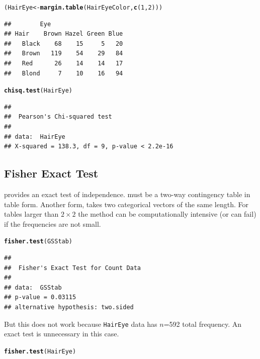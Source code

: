 \documentclass[10pt,twoside]{article}\usepackage[]{graphicx}\usepackage[]{color}
\makeatletter
\newcommand{\hlnum}[1]{\textcolor[rgb]{0.686,0.059,0.569}{#1}}%
\newcommand{\hlstd}[1]{\textcolor[rgb]{0.345,0.345,0.345}{#1}}%
\newcommand{\hlkwb}[1]{\textcolor[rgb]{0.69,0.353,0.396}{#1}}%
\newcommand{\hlkwd}[1]{\textcolor[rgb]{0.737,0.353,0.396}{\textbf{#1}}}%
\newenvironment{kframe}{%
 \def\at@end@of@kframe{}%
 \ifinner\ifhmode%
  \def\at@end@of@kframe{\end{minipage}}%
  \begin{minipage}{\columnwidth}%
 \fi\fi%
 \def\FrameCommand##1{\hskip\@totalleftmargin \hskip-\fboxsep
 \colorbox{shadecolor}{##1}\hskip-\fboxsep
     \hskip-\linewidth \hskip-\@totalleftmargin \hskip\columnwidth}%
 \MakeFramed {\advance\hsize-\width
   \@totalleftmargin\z@ \linewidth\hsize
   \@setminipage}}%
 {\par\unskip\endMakeFramed%
 \at@end@of@kframe}
\newenvironment{knitrout}{}{} %
\newcommand{\data}[1]{\texttt{#1}}
\makeatother
\begin{document}
\begin{knitrout}
\color{fgcolor}\begin{kframe}
\begin{alltt}
\hlstd{(HairEye} \hlkwb{<-} \hlkwd{margin.table}\hlstd{(HairEyeColor,} \hlkwd{c}\hlstd{(}\hlnum{1}\hlstd{,} \hlnum{2}\hlstd{)))}
\end{alltt}
\begin{verbatim}
##        Eye
## Hair    Brown Hazel Green Blue
##   Black    68    15     5   20
##   Brown   119    54    29   84
##   Red      26    14    14   17
##   Blond     7    10    16   94
\end{verbatim}
\begin{alltt}
\hlkwd{chisq.test}\hlstd{(HairEye)}
\end{alltt}
\begin{verbatim}
## 
## 	Pearson's Chi-squared test
## 
## data:  HairEye
## X-squared = 138.3, df = 9, p-value < 2.2e-16
\end{verbatim}
\end{kframe}
\end{knitrout}


\subsection{Fisher Exact Test}\label{sec:Fisher}

 provides an  exact test of  independence.  must be  a two-way
contingency table in table form.  Another form, 
 takes two
categorical vectors of the same length.  
For tables larger than $2 \times 2$ the method can be computationally intensive (or can fail) if
the frequencies are not small.

\begin{knitrout}
\color{fgcolor}\begin{kframe}
\begin{alltt}
\hlkwd{fisher.test}\hlstd{(GSStab)}
\end{alltt}
\begin{verbatim}
## 
## 	Fisher's Exact Test for Count Data
## 
## data:  GSStab
## p-value = 0.03115
## alternative hypothesis: two.sided
\end{verbatim}
\end{kframe}
\end{knitrout}


But this does not work because \data{HairEye} data has $n$=592 total frequency.
An exact test is unnecessary in this case.
\begin{knitrout}
\color{fgcolor}\begin{kframe}
\begin{alltt}
\hlkwd{fisher.test}\hlstd{(HairEye)}
\end{alltt}
\end{kframe}
\end{knitrout}
\end{document}
